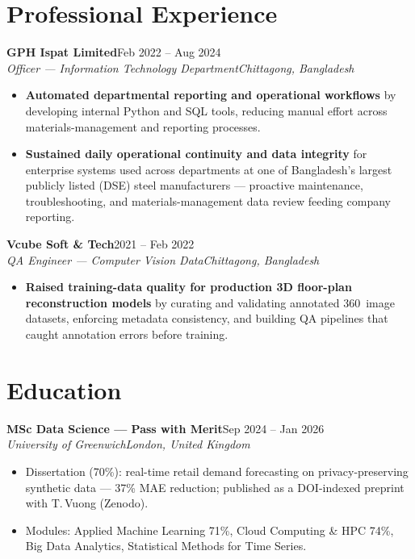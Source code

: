 \documentclass[10pt,a4paper]{article}
\newcommand{\entry}[4]{%
  \textbf{#1}\hfill{\color{muted}\small #2}\\[1pt]
  {\color{accent}\itshape #3}\hfill{\color{muted}\itshape\small #4}\par\vspace{2pt}}
\begin{document}
\section{Professional Experience}

\entry{GPH Ispat Limited}{Feb 2022 -- Aug 2024}{Officer --- Information Technology Department}{Chittagong, Bangladesh}
\begin{itemize}
  \item \textbf{Automated departmental reporting and operational workflows} by developing internal Python and SQL tools, reducing manual effort across materials-management and reporting processes.
  \item \textbf{Sustained daily operational continuity and data integrity} for enterprise systems used across departments at one of Bangladesh's largest publicly listed (DSE) steel manufacturers --- proactive maintenance, troubleshooting, and materials-management data review feeding company reporting.
\end{itemize}

\entry{Vcube Soft \& Tech}{2021 -- Feb 2022}{QA Engineer --- Computer Vision Data}{Chittagong, Bangladesh}
\begin{itemize}
  \item \textbf{Raised training-data quality for production 3D floor-plan reconstruction models} by curating and validating annotated 360\textdegree\ image datasets, enforcing metadata consistency, and building QA pipelines that caught annotation errors before training.
\end{itemize}

\section{Education}

\entry{MSc Data Science --- Pass with Merit}{Sep 2024 -- Jan 2026}{University of Greenwich}{London, United Kingdom}
\begin{itemize}
  \item Dissertation (70\%): real-time retail demand forecasting on privacy-preserving synthetic data --- 37\% MAE reduction; published as a DOI-indexed preprint with T.\,Vuong (Zenodo).
  \item Modules: Applied Machine Learning 71\%, Cloud Computing \& HPC 74\%, Big Data Analytics, Statistical Methods for Time Series.
\end{itemize}
\end{document}
